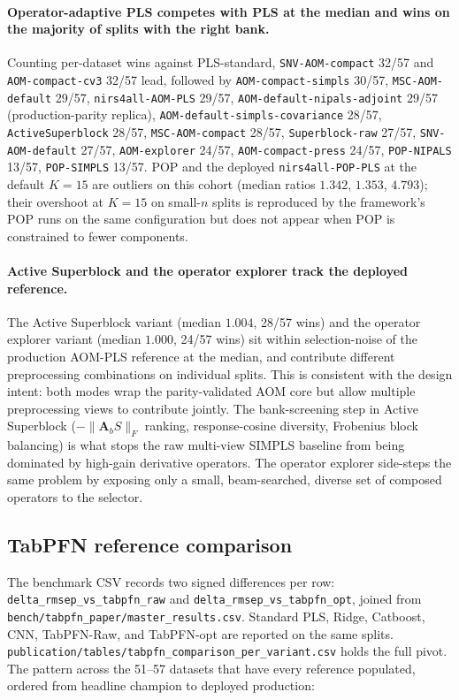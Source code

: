 \documentclass[review,a4paper]{elsarticle}
\newcommand{\Amat}{\mathbf{A}}
\newcommand{\AOM}{\textsc{AOM}\xspace}
\newcommand{\POP}{\textsc{POP}\xspace}
\newcommand{\PLS}{\textsc{PLS}\xspace}
\newcommand{\SIMPLS}{\textsc{SIMPLS}\xspace}
\begin{document}
\paragraph{Operator-adaptive \PLS competes with \PLS at the median and
wins on the majority of splits with the right bank.}
Counting per-dataset wins against \PLS-standard, \texttt{SNV-AOM-compact}
32/57 and \texttt{AOM-compact-cv3} 32/57 lead, followed by
\texttt{AOM-compact-simpls} 30/57, \texttt{MSC-AOM-default} 29/57,
\texttt{nirs4all-AOM-PLS} 29/57, \texttt{AOM-default-nipals-adjoint}
29/57 (production-parity replica), \texttt{AOM-default-simpls-covariance} 28/57,
\texttt{ActiveSuperblock} 28/57, \texttt{MSC-AOM-compact} 28/57,
\texttt{Superblock-raw} 27/57, \texttt{SNV-AOM-default} 27/57,
\texttt{AOM-explorer} 24/57, \texttt{AOM-compact-press} 24/57,
\texttt{POP-NIPALS} 13/57, \texttt{POP-SIMPLS} 13/57. \POP and the
deployed \texttt{nirs4all-POP-PLS} at the default $K{=}15$ are outliers
on this cohort (median ratios $1.342$, $1.353$, $4.793$); their
overshoot at $K{=}15$ on small-$n$ splits is reproduced by the
framework's \POP runs on the same configuration but does not appear
when \POP is constrained to fewer components.

\paragraph{Active Superblock and the operator explorer track the
deployed reference.}
The Active Superblock variant (median $1.004$, 28/57 wins) and the
operator explorer variant (median $1.000$, 24/57 wins) sit within
selection-noise of the production \AOM-\PLS reference at the median,
and contribute different preprocessing combinations on individual
splits. This is consistent with the design intent: both modes wrap
the parity-validated \AOM core but allow multiple preprocessing views
to contribute jointly. The bank-screening step in Active Superblock
($-\|\Amat_b S\|_F$ ranking, response-cosine diversity, Frobenius
block balancing) is what stops the raw multi-view \SIMPLS baseline
from being dominated by high-gain derivative operators. The operator
explorer side-steps the same problem by exposing only a small,
beam-searched, diverse set of composed operators to the selector.

\subsection{TabPFN reference comparison}

The benchmark CSV records two signed differences per row:
\verb|delta_rmsep_vs_tabpfn_raw| and
\verb|delta_rmsep_vs_tabpfn_opt|, joined from
\verb|bench/tabpfn_paper/master_results.csv|. Standard \PLS, Ridge,
Catboost, CNN, TabPFN-Raw, and TabPFN-opt are reported on the same
splits.
\verb|publication/tables/tabpfn_comparison_per_variant.csv| holds the
full pivot. The pattern across the 51--57 datasets that have every
reference populated, ordered from headline champion to deployed
production:
\end{document}
